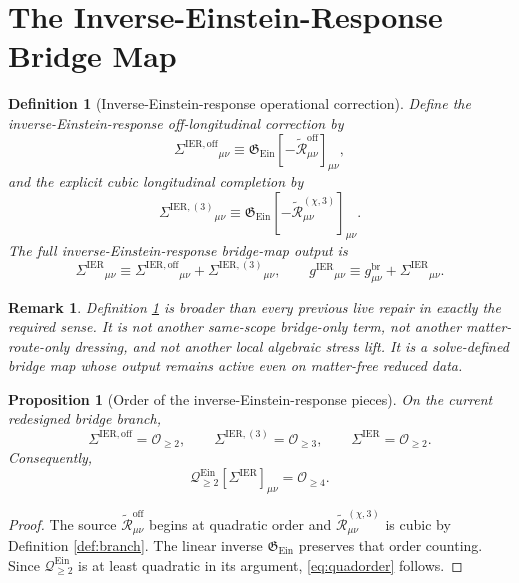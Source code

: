 \documentclass[11pt]{article}
\newcommand{\ReBridge}{g^{\mathrm{br}}}
\newcommand{\OpMetricIER}{g^{\mathrm{IER}}}
\newcommand{\SigmaIER}{\Sigma^{\mathrm{IER}}}
\newcommand{\SigmaOff}{\Sigma^{\mathrm{IER,off}}}
\newcommand{\SigmaLongThree}{\Sigma^{\mathrm{IER},(3)}}
\newcommand{\ReOff}{\widetilde{\mathcal R}_{\mu\nu}^{\mathrm{off}}}
\newcommand{\ReLongThree}{\widetilde{\mathcal R}_{\mu\nu}^{(\chi,3)}}
\newcommand{\EinQuad}{\mathcal Q_{\ge 2}^{\mathrm{Ein}}}
\newcommand{\EinInv}{\mathfrak G_{\mathrm{Ein}}}
\newtheorem{definition}{Definition}
\newtheorem{proposition}{Proposition}
\newtheorem{remark}{Remark}
\begin{document}
\section{The Inverse-Einstein-Response Bridge Map}

\begin{definition}[Inverse-Einstein-response operational correction]
\label{def:sigma}
Define the \emph{inverse-Einstein-response off-longitudinal correction} by
\begin{equation}
\SigmaOff{}_{\mu\nu}
\equiv
\EinInv[-\ReOff]_{\mu\nu},
\label{eq:sigmaoff}
\end{equation}
and the \emph{explicit cubic longitudinal completion} by
\begin{equation}
\SigmaLongThree{}_{\mu\nu}
\equiv
\EinInv[-\ReLongThree]_{\mu\nu}.
\label{eq:sigmalong}
\end{equation}
The full inverse-Einstein-response bridge-map output is
\begin{equation}
\SigmaIER{}_{\mu\nu}
\equiv
\SigmaOff{}_{\mu\nu}
+\SigmaLongThree{}_{\mu\nu},
\qquad
\OpMetricIER{}_{\mu\nu}
\equiv
\ReBridge_{\mu\nu}
+\SigmaIER{}_{\mu\nu}.
\label{eq:sigmaier}
\end{equation}
\end{definition}

\begin{remark}
Definition \ref{def:sigma} is broader than every previous live repair in exactly the required sense. It is not another same-scope bridge-only term, not another matter-route-only dressing, and not another local algebraic stress lift. It is a solve-defined bridge map whose output remains active even on matter-free reduced data.
\end{remark}

\begin{proposition}[Order of the inverse-Einstein-response pieces]
\label{prop:orders}
On the current redesigned bridge branch,
\begin{equation}
\SigmaOff=\mathcal O_{\ge 2},
\qquad
\SigmaLongThree=\mathcal O_{\ge 3},
\qquad
\SigmaIER=\mathcal O_{\ge 2}.
\label{eq:orders}
\end{equation}
Consequently,
\begin{equation}
\EinQuad[\SigmaIER]_{\mu\nu}=\mathcal O_{\ge 4}.
\label{eq:quadorder}
\end{equation}
\end{proposition}

\begin{proof}
The source \(\ReOff\) begins at quadratic order and \(\ReLongThree\) is cubic by Definition \ref{def:branch}. The linear inverse \(\EinInv\) preserves that order counting. Since \(\EinQuad\) is at least quadratic in its argument, \eqref{eq:quadorder} follows.
\end{proof}
\end{document}
